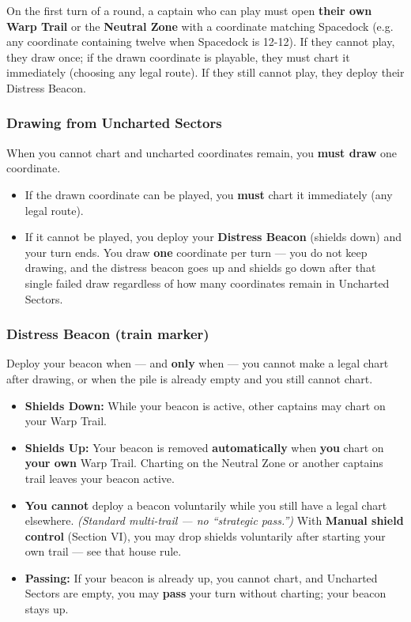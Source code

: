 \documentclass[11pt]{article}
\providecommand{\tightlist}{%
  \setlength{\itemsep}{0pt}\setlength{\parskip}{0pt}}
\begin{document}
On the first turn of a round, a captain who can play must open
\textbf{their own Warp Trail} or the \textbf{Neutral Zone} with a
coordinate matching Spacedock (e.g. any coordinate containing twelve when
Spacedock is 12-12). If they cannot play, they draw once; if the drawn
coordinate is playable, they must chart it immediately (choosing any legal
route). If they still cannot play, they deploy their Distress Beacon.

\subsubsection{Drawing from Uncharted
Sectors}\label{drawing-from-uncharted-sectors}

When you cannot chart and uncharted coordinates remain, you \textbf{must
draw} one coordinate.

\begin{itemize}
\tightlist
\item
  If the drawn coordinate can be played, you \textbf{must} chart it
  immediately (any legal route).
\item
  If it cannot be played, you deploy your \textbf{Distress Beacon}
  (shields down) and your turn ends. You draw \textbf{one} coordinate per turn
  --- you do not keep drawing, and the distress beacon goes up and shields go
  down after that single failed draw regardless of how many coordinates remain
  in Uncharted Sectors.
\end{itemize}

\subsubsection{Distress Beacon (train
marker)}\label{distress-beacon-train-marker}

Deploy your beacon when --- and \textbf{only} when --- you cannot make a
legal chart after drawing, or when the pile is already empty and you
still cannot chart.

\begin{itemize}
\tightlist
\item
  \textbf{Shields Down:} While your beacon is active, other captains may
  chart on your Warp Trail.
\item
  \textbf{Shields Up:} Your beacon is removed \textbf{automatically}
  when \textbf{you} chart on \textbf{your own} Warp Trail. Charting on
  the Neutral Zone or another captain\textquotesingle s trail leaves
  your beacon active.
\item
  \textbf{You cannot} deploy a beacon voluntarily while you still have a
  legal chart elsewhere. \emph{(Standard multi-trail --- no ``strategic
  pass.'')} With \textbf{Manual shield control} (Section VI), you may
  drop shields voluntarily after starting your own trail --- see that
  house rule.
\item
  \textbf{Passing:} If your beacon is already up, you cannot chart, and
  Uncharted Sectors are empty, you may \textbf{pass} your turn without
  charting; your beacon stays up.
\end{itemize}
\end{document}
